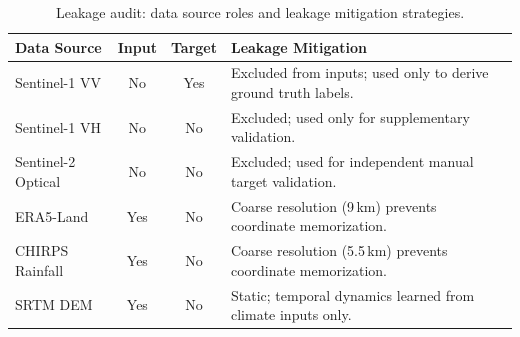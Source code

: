 \documentclass[12pt, a4paper]{article}
\begin{document}
\begin{table}[t]
\caption{Leakage audit: data source roles and leakage mitigation strategies.}
\label{tab:leakage_audit}
\centering
\small
\begin{tabular}{p{2.6cm} c c p{6.8cm}}
\hline
\textbf{Data Source} & \textbf{Input} & \textbf{Target} & \textbf{Leakage Mitigation} \\
\hline
Sentinel-1 VV  & No  & Yes & Excluded from inputs; used only to derive ground truth labels. \\
Sentinel-1 VH  & No  & No  & Excluded; used only for supplementary validation. \\
Sentinel-2 Optical & No & No & Excluded; used for independent manual target validation. \\
ERA5-Land      & Yes & No  & Coarse resolution (9\,km) prevents coordinate memorization. \\
CHIRPS Rainfall & Yes & No  & Coarse resolution (5.5\,km) prevents coordinate memorization. \\
SRTM DEM       & Yes & No  & Static; temporal dynamics learned from climate inputs only. \\
\hline
\end{tabular}
\end{table}
\end{document}
